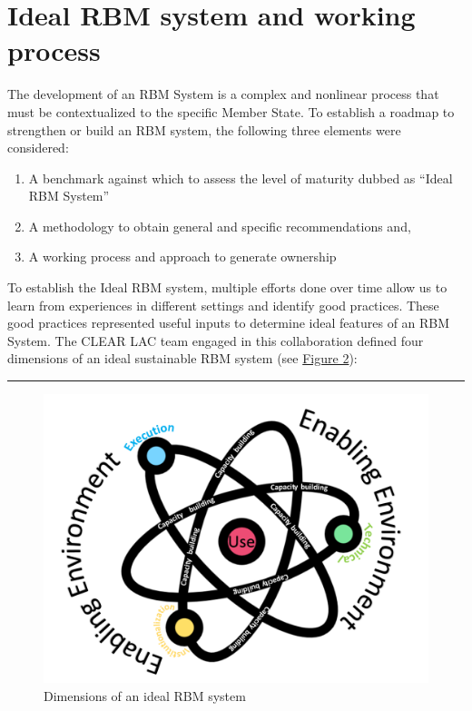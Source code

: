\documentclass[
  10pt,
]{book}
\providecommand{\tightlist}{%
  \setlength{\itemsep}{0pt}\setlength{\parskip}{0pt}}
\begin{document}
\hypertarget{ideal-rbm-system-and-working-process}{%
\section{Ideal RBM system and working process}\label{ideal-rbm-system-and-working-process}}

The development of an RBM System is a complex and nonlinear process that must be contextualized to the specific Member State. To establish a roadmap to strengthen or build an RBM system, the following three elements were considered:

\begin{enumerate}
\def\labelenumi{\arabic{enumi}.}
\tightlist
\item
  A benchmark against which to assess the level of maturity dubbed as ``Ideal RBM System''
\item
  A methodology to obtain general and specific recommendations and,
\item
  A working process and approach to generate ownership
\end{enumerate}

To establish the Ideal RBM system, multiple efforts done over time allow us to learn from experiences in different settings and identify good practices. These good practices represented useful inputs to determine ideal features of an RBM System. The CLEAR LAC team engaged in this collaboration defined four dimensions of an ideal sustainable RBM system (see \protect\hyperlink{fig:figure2}{Figure 2}):

\begin{center}\rule{0.5\linewidth}{0.5pt}\end{center}

\begin{figure}

{\centering \includegraphics[width=1\linewidth]{./images/figure_2} 

}

\caption{Dimensions of an ideal RBM system}\label{fig:figure2}
\end{figure}
\end{document}

